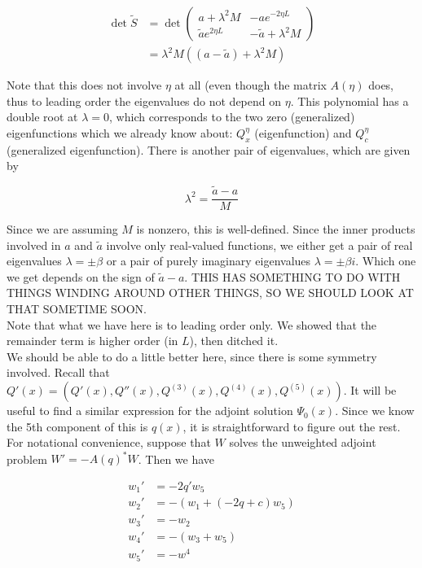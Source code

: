 \documentclass[12pt]{article}
\begin{document}
\begin{align*}
\det \tilde{S} &= \det \begin{pmatrix}
a + \lambda^2 M & -a e^{-2 \eta L}  \\ \tilde{a} e^{2 \eta L} & -\tilde{a} + \lambda^2 M 
\end{pmatrix} \\
&= \lambda^2 M ( (a - \tilde{a}) + \lambda^2 M)
\end{align*}

Note that this does not involve $\eta$ at all (even though the matrix $A(\eta)$ does, thus to leading order the eigenvalues do not depend on $\eta$. This polynomial has a double root at $\lambda = 0$, which corresponds to the two zero (generalized) eigenfunctions which we already know about: $Q^\eta_x$ (eigenfunction) and $Q^\eta_c$ (generalized eigenfunction). There is another pair of eigenvalues, which are given by

\[
\lambda^2 = \frac{\tilde{a} - a}{M}
\]

Since we are assuming $M$ is nonzero, this is well-defined. Since the inner products involved in $a$ and $\tilde{a}$ involve only real-valued functions, we either get a pair of real eigenvalues $\lambda = \pm \beta$ or a pair of purely imaginary eigenvalues $\lambda = \pm \beta i$. Which one we get depends on the sign of $\tilde{a} - a$. THIS HAS SOMETHING TO DO WITH THINGS WINDING AROUND OTHER THINGS, SO WE SHOULD LOOK AT THAT SOMETIME SOON.\\

Note that what we have here is to leading order only. We showed that the remainder term is higher order (in $L$), then ditched it.\\

We should be able to do a little better here, since there is some symmetry involved. Recall that $Q'(x) = (Q'(x), Q''(x), Q^{(3)}(x), Q^{(4)}(x), Q^{(5)}(x))$. It will be useful to find a similar expression for the adjoint solution $\Psi_0(x)$. Since we know the 5th component of this is $q(x)$, it is straightforward to figure out the rest. For notational convenience, suppose that $W$ solves the unweighted adjoint problem $W' = -A(q)^* W$. Then we have

\begin{align*}
w_1' &= -2q' w_5 \\
w_2' &= -(w_1 + (-2q + c)w_5) \\
w_3' &= -w_2 \\
w_4' &= -(w_3 + w_5) \\
w_5' &= -w^4 
\end{align*}
\end{document}
